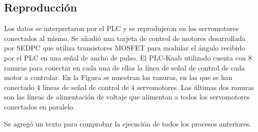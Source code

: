 \subsection{Reproducción}

Los datos se interpretaron por el PLC y se reprodujeron en los servomotores conectados al mismo. Se añadió una tarjeta de control de motores desarrollada por SEDPC que utiliza transistores MOSFET para modular el ángulo recibido por el PLC en una señal de ancho de pulso. El PLC-Kaab utilizado cuenta con 8 ranuras para conectar en cada una de ellas la línea de señal de control de cada motor a controlar. En la Figura se muestran las ranuras, en las que se han conectado 4 líneas de señal de control de 4 servomotores. Las últimas dos ranuras son las líneas de alimentación de voltaje que alimentan a todos los servomotores conectados en paralelo.

Se agregó un texto para comprobar la ejecución de todos los procesos anteriores.